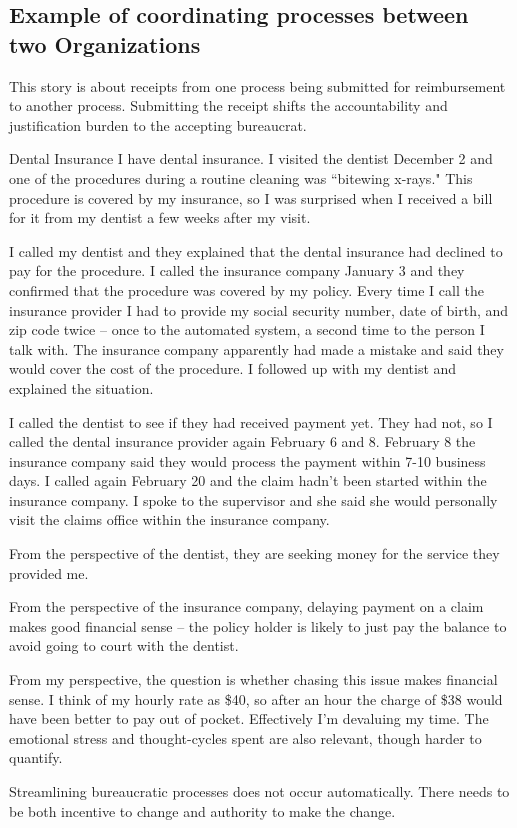 \subsection*{Example of coordinating processes between two Organizations}
This story is about receipts from one process being submitted for reimbursement to another process.
Submitting the receipt shifts the accountability and justification burden to the accepting bureaucrat.

\begin{storytime}{Dental Insurance}
I have dental insurance. I visited the dentist December 2 and one of the procedures during a routine cleaning was ``bitewing x-rays." This procedure is covered by my insurance, so I was surprised when I received a bill for it from my dentist a few weeks after my visit.

I called my dentist and they explained that the dental insurance had declined to pay for the procedure. I called the insurance company January 3 and they confirmed that the procedure was covered by my policy. 
Every time I call the insurance provider I had to provide my social security number, date of birth, and zip code twice -- once to the automated system, a second time to the person I talk with. The insurance company apparently had made a mistake and said they would cover the cost of the procedure. I followed up with my dentist and explained the situation.

I called the dentist to see if they had received payment yet. They had not, so I called the dental insurance provider again February 6 and 8. February 8 the insurance company said they would process the payment within 7-10 business days. I called again February 20 and the claim hadn't been started within the insurance company. I spoke to the supervisor and she said she would personally visit the claims office within the insurance company.

From the perspective of the dentist, they are seeking money for the service they provided me.

From the perspective of the insurance company, delaying payment on a claim makes good financial sense -- the policy holder is likely to just pay the balance to avoid going to court with the dentist.

From my perspective, the question is whether chasing this issue makes financial sense. I think of my hourly rate as \$40, so after an hour the charge of \$38 would have been better to pay out of pocket. Effectively I'm devaluing my time. The emotional stress and thought-cycles spent are also relevant, though harder to quantify.

Streamlining bureaucratic processes does not occur automatically. There needs to be both incentive to change and authority to make the change. 
\end{storytime}

